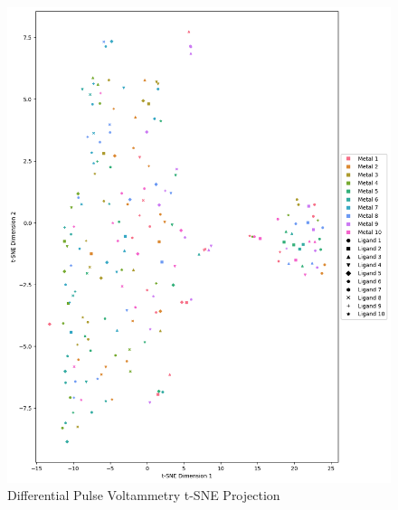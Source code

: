 \begin{figure}[h!]
  \centering
    \includegraphics[width=1.0\textwidth]{figures/dpv_tsne.png}
    \caption{Differential Pulse Voltammetry t-SNE Projection}
    \label{dpv-tsne}
\end{figure}
